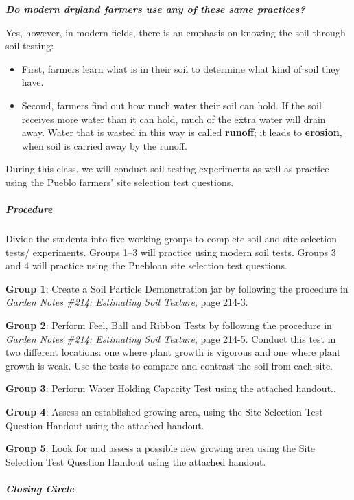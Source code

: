 \documentclass[12pt,]{article}
\providecommand{\tightlist}{%
  \setlength{\itemsep}{0pt}\setlength{\parskip}{0pt}}
\let\oldsubparagraph\subparagraph
\renewcommand{\subparagraph}[1]{\oldsubparagraph{#1}\mbox{}}
\begin{document}
\textbf{\emph{Do modern dryland farmers use any of these same practices? }}

Yes, however, in modern fields, there is an emphasis on knowing the soil through soil testing:

\begin{itemize}
\tightlist
\item
  First, farmers learn what is in their soil to determine what kind of soil they have.
\item
  Second, farmers find out how much water their soil can hold. If the soil receives more water than it can hold, much of the extra water will drain away. Water that is wasted in this way is called \textbf{runoff}; it leads to \textbf{erosion}, when soil is carried away by the runoff.
\end{itemize}

During this class, we will conduct soil testing experiments as well as practice using the Pueblo farmers' site selection test questions.

\hypertarget{procedure-1}{%
\subparagraph{Procedure}\label{procedure-1}}

Divide the students into five working groups to complete soil and site selection tests/ experiments. Groups 1--3 will practice using modern soil tests. Groups 3 and 4 will practice using the Puebloan site selection test questions.

\textbf{Group 1}: Create a Soil Particle Demonstration jar by following the procedure in \emph{Garden Notes \#214: Estimating Soil Texture}, page 214-3.

\textbf{Group 2}: Perform Feel, Ball and Ribbon Tests by following the procedure in \emph{Garden Notes \#214: Estimating Soil Texture}, page 214-5. Conduct this test in two different locations: one where plant growth is vigorous and one where plant growth is weak. Use the tests to compare and contrast the soil from each site.

\textbf{Group 3}: Perform Water Holding Capacity Test using the attached handout..

\textbf{Group 4}: Assess an established growing area, using the Site Selection Test Question Handout using the attached handout.

\textbf{Group 5}: Look for and assess a possible new growing area using the Site Selection Test Question Handout using the attached handout.

\hypertarget{closing-circle}{%
\subparagraph{Closing Circle}\label{closing-circle}}
\end{document}
